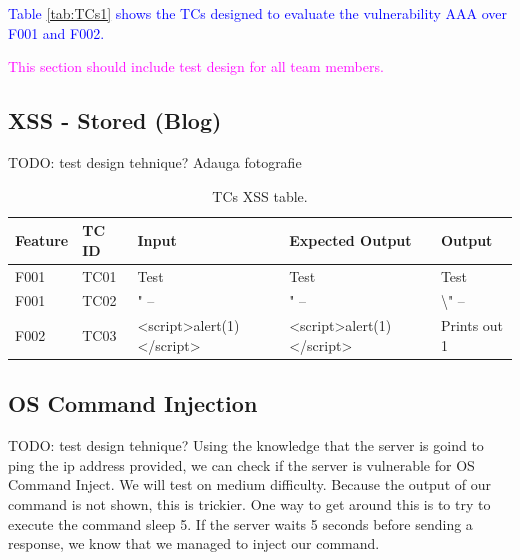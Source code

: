 \documentclass{article}
\begin{document}
\textcolor{blue}{Table \ref{tab:TCs1} shows the TCs designed to evaluate the vulnerability AAA over F001 and F002.}


\textcolor{magenta}{This section should include test design for all team members.}


\subsection{XSS - Stored (Blog)}
TODO: test design tehnique? Adauga fotografie
\begin{table} [htpb]
    \centering
    \begin{tabular}{l|l|l|l|l}
        Feature & TC ID & Input                     & Expected Output           & Output              \\ \hline
        F001    & TC01  & Test                      & Test                      & Test                \\
        F001    & TC02  & " --                      & " --                      & \textbackslash " -- \\
        F002    & TC03  & <script>alert(1)</script> & <script>alert(1)</script> & Prints out 1        \\
    \end{tabular}
    \caption{\label{tab:TC-XSS}TCs XSS table.}
\end{table}

\subsection{OS Command Injection}
TODO: test design tehnique?
Using the knowledge that the server is goind to ping the ip address provided, we can check if the server is vulnerable for OS Command Inject.
We will test on medium difficulty.
Because the output of our command is not shown, this is trickier. One way to get around this is to try to execute the command sleep 5.
If the server waits 5 seconds before sending a response, we know that we managed to inject our command.
\end{document}
